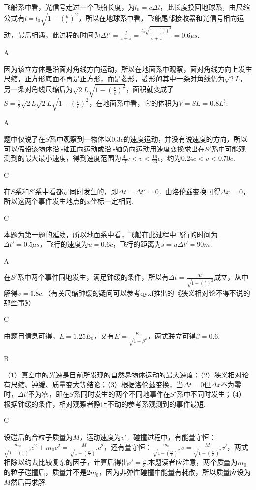 \documentclass[b5paper,opensource,sourcefont,parskip]{qyxf-book}
\begin{document}
飞船系中看，光信号走过一个飞船长度，为$l_0=c\Delta t$，此长度换回地球系，由尺缩公式有$l=l_0\sqrt{1-(\frac{u}{c})^2}$，所以在地球系中看，飞船尾部接收器和光信号相向运动，最后相遇，此过程的时间为$\Delta t'=\frac{l}{c+u}=\frac{l_0\sqrt{1-(\frac{u}{c})^2}}{c+u}=0.6\mu s$.

A

\solve
因为该立方体是沿面对角线方向运动，所以在地面系中观察，面对角线方向上发生尺缩，正方形底面不再是正方形，而是菱形，菱形的其中一条对角线仍为$\sqrt{2}L$，另一条对角线尺缩后为$\sqrt{2}L\sqrt{1-(\frac{v}{c})^2}$，面积就变成了$S=\frac{1}{2}\sqrt{2}L\sqrt{2}L\sqrt{1-(\frac{v}{c})^2}$，在地面系中看，它的体积为$V=SL=0.8L^3$.

A

\solve
题中仅说了在$S$系中观察到一物体以$0.3c$的速度运动，并没有说速度的方向，所以可以假设该物体沿$x$轴正向运动或沿$x$轴负向运动用速度变换求出在$S'$系中可能观测到的最大最小速度，得到速度范围为$\frac{4}{17}c<v<\frac{16}{23}c$，约为$0.24c<v<0.70c$.

C

\solve
在$S$系和$S'$系中看都是同时发生的，即$\Delta t=\Delta t'=0$，由洛伦兹变换可得$\Delta x=0$，所以这两个事件发生地点的$x$坐标一定相同.

C

\solve
本题为第一题的延续，所以地面系中看，飞船在此过程中飞行的时间为$\Delta t'=0.5\mu s$，飞行的速度为$u=0.6c$，飞行的距离为$s=u\Delta t'=90m$.

A

\solve
在$S'$系中两个事件同地发生，满足钟缓的条件，所以有$\Delta t=\frac{\Delta t'}{\sqrt{1-(\frac{v}{c})^2}}$成立，从中解得$v=0.8c$.（有关尺缩钟缓的疑问可以参考qyxf推出的《狭义相对论不得不说的那些事》）

C

\solve
由题目信息可得，$E=1.25E_0$，又有$E=\frac{E_0}{\sqrt{1-\beta^2}}$，两式联立可得$\beta=0.6$.

B

\solve
（1）真空中的光速是目前所发现的自然界物体运动的最大速度；（2）狭义相对论有尺缩、钟缓、质量变大等结论；（3）根据洛伦兹变换，当$\Delta t=0$但$\Delta x$不为零时，$\Delta t'$不为零，即在$S$系同时发生的两个不同地事件在$S'$系中不同时发生；（4）根据钟缓的条件，相对观察者静止不动的参考系观测到的事件最短.

C

\solve
设碰后的合粒子质量为$M$，运动速度为$v'$，碰撞过程中，有能量守恒：$\frac{m_0}{\sqrt{1-(\frac{v}{c})^2}}c^2+m_0c^2=\frac{M}{\sqrt{1-(\frac{v'}{c})^2}}c^2$，还有量守恒：$\frac{m_0}{\sqrt{1-(\frac{v'}{c})^2}}v=\frac{M}{\sqrt{1-(\frac{v'}{c})^2}}v'$，两式相除以约去比较复杂的因子，计算后得出$v'=\frac{c}{3}$.本题读者应注意，两个质量为$m_0$的粒子碰撞后，质量并不是$2m_0$，因为非弹性碰撞中能量有耗散，所以质量应设为$M$然后再求解.
\end{document}
